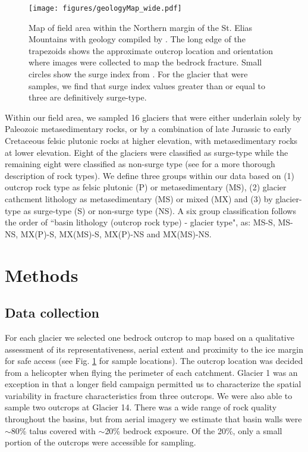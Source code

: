 \documentclass[review]{igs}
\begin{document}
\begin{figure}[H]
  \centering
  \texttt{[image: figures/geologyMap\_wide.pdf]}
  \caption[]{Map of field area within the Northern margin of the St. Elias Mountains with geology compiled by \cite{Gordey1999}. The long edge of the trapezoids shows the approximate outcrop location and orientation where images were collected to map the bedrock fracture. Small circles show the surge index from \cite{Clarke1986}. For the glacier that were samples, we find that surge index values greater than or equal to three are definitively surge-type.}
\label{map}
\end{figure}


Within our field area, we sampled 16 glaciers that were either underlain solely by Paleozoic metasedimentary rocks, or by a combination of late Jurassic to early Cretaceous felsic plutonic rocks at higher elevation, with metasedimentary rocks at lower elevation. Eight of the glaciers were classified as surge-type while the remaining eight were classified as non-surge type (see \cite{Crompton2016} for a more thorough description of rock types). We define three groups within our data based on (1) outcrop rock type as felsic plutonic (P) or metasedimentary (MS), (2) glacier cathcment lithology as metasedimentary (MS) or mixed (MX) and (3) by glacier-type as surge-type (S) or non-surge type (NS). A six group classification follows the order of ``basin lithology (outcrop rock type) - glacier type", as: MS-S, MS-NS, MX(P)-S, MX(MS)-S, MX(P)-NS and MX(MS)-NS. 

\section{Methods}

\subsection{Data collection}

For each glacier we selected one bedrock outcrop to map based on a qualitative assessment of its representativeness, aerial extent and proximity to the ice margin for safe access (see Fig. \ref{map} for sample locations). The outcrop location was decided from a helicopter when flying the perimeter of each catchment. Glacier 1 was an exception in that a longer field campaign permitted us to characterize the spatial variability in fracture characteristics from three outcrops. We were also able to sample two outcrops at Glacier 14. There was a wide range of rock quality throughout the basins, but from aerial imagery we estimate that basin walls were $\sim$80\% talus covered with $\sim$20\% bedrock exposure. Of the 20\%, only a small portion of the outcrops were accessible for sampling. 
\end{document}
